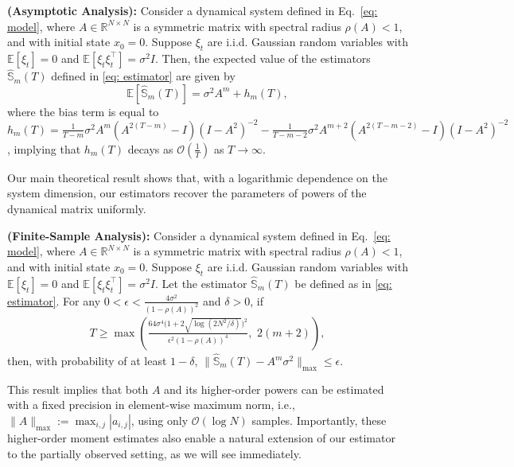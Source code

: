 \documentclass[11pt]{article}
\begin{document}
\begin{theorem}
\label{Theorem: expectation}
\textbf{(Asymptotic Analysis):} Consider a dynamical system defined in Eq.~\eqref{eq: model}, where $A \in \mathbb{R}^{N\times N}$ is a symmetric matrix with spectral radius $\rho(A) < 1$,
and with initial state $x_0 = 0$.
Suppose ${\xi_t}$ are i.i.d. Gaussian random variables with $\mathbb{E}[\xi_t] = 0$ and $\mathbb{E}[\xi_t \xi_t^\top] = \sigma^2 I$. Then, the expected value of the estimators $\hat{\mathbb{S}}_m(T)$ defined in \eqref{eq: estimator} are given by
$$
    \mathbb{E}[\hat{\mathbb{S}}_m(T)] = \sigma^2 A^m + h_m(T),
$$
where the bias term is equal to $h_m(T)=\frac{1}{T-m}  \sigma^2A^m(A^{2(T-m)}-I)(I-A^2)^{-2} - \frac{1}{T-m-2} \sigma^2A^{m+2}(A^{2(T-m-2)}-I)(I-A^2)^{-2}$, implying that $h_m(T)$ decays as $\mathcal{O}(\frac{1}{T})$ as $T \to \infty$.
\end{theorem}

Our main theoretical result shows that, with a logarithmic dependence on the system dimension, our estimators recover the parameters of powers of the dynamical matrix uniformly.

\begin{theorem}
    \label{Theorem: main}
    \textbf{(Finite-Sample Analysis):}  Consider a dynamical system defined in Eq.~\eqref{eq: model}, where $A \in \mathbb{R}^{N\times N}$ is a symmetric matrix with spectral radius $\rho(A) < 1$,
and with initial state $x_0 = 0$.
Suppose ${\xi_t}$ are i.i.d. Gaussian random variables with $\mathbb{E}[\xi_t] = 0$ and $\mathbb{E}[\xi_t \xi_t^\top] = \sigma^2 I$.
   Let the estimator $\hat{\mathbb{S}}_m(T)$ be defined as in \eqref{eq: estimator}. For any $0<\epsilon <\frac{4\sigma^2}{(1-\rho(A))^2}$ and $\delta >0$, if 
    \begin{align*}
        T \ge \max\left(\frac{64\sigma^4\Big(1+2\sqrt{\log(2N^2/\delta)}\Big)^2}{\epsilon^2(1-\rho(A))^4},  \,\,  2(m+2) \right),
    \end{align*}
    then, with probability of at least $1-\delta$, $\|\hat{\mathbb{S}}_m(T) - A^m\sigma^2\|_{\max} \le \epsilon$. 
\end{theorem}
This result implies that both $A$ and its higher-order powers can be estimated with a fixed precision in element-wise maximum norm, i.e., $\|A\|_{\max}:=\max_{i,j}|a_{i,j}|$, using only $\mathcal{O}(\log N)$ samples. Importantly, these higher-order moment estimates also enable a natural extension of our estimator to the partially observed setting, as we will see immediately.
\end{document}
